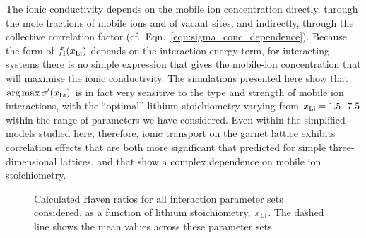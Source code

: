 \documentclass[aps,prb,twocolumn,superscriptaddress,reprint]{revtex4-1}
\newcommand{\xLi}{x_\m{Li}}
\begin{document}
The ionic conductivity depends on the mobile ion concentration directly, through the mole fractions of mobile ions and of vacant sites, and indirectly, through the collective correlation factor (cf.\ Eqn.~\ref{eqn:sigma_conc_dependence}). Because the form of $f_\m{I}(\xLi)$ depends on the interaction energy term, for interacting systems there is no simple expression that gives the mobile-ion concentration that will maximise the ionic conductivity. The simulations presented here show that $\arg \max \sigma^\prime(\xLi)$ is in fact very sensitive to the type and strength of mobile ion interactions, with the ``optimal'' lithium stoichiometry varying from $\xLi=1.5$--$7.5$ within the range of parameters we have considered. Even within the simplified models studied here, therefore, ionic transport on the garnet lattice exhibits correlation effects that are both more significant that predicted for simple three-dimensional lattices, and that show a complex dependence on mobile ion stoichiometry.

\begin{figure}[tb]
  \centering
    \caption{\label{fig:haven_ratios}Calculated Haven ratios for all interaction parameter sets considered, as a function of lithium stoichiometry, $\xLi$. The dashed line shows the mean values across these parameter sets.}
\end{figure}
\end{document}
